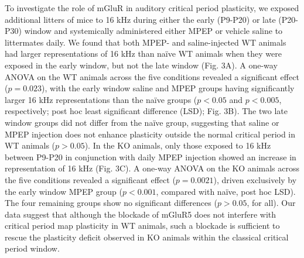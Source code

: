 To investigate the role of mGluR in auditory critical period plasticity, we exposed additional litters of mice to 16 kHz during either the early (P9-P20) or late (P20-P30) window and systemically administered either MPEP or vehicle saline to littermates daily. We found that both MPEP- and saline-injected WT animals had larger representations of 16 kHz than na\"ive WT animals when they were exposed in the early window, but not the late window (Fig. 3A). A one-way ANOVA on the WT animals across the five conditions revealed a significant effect ($p=0.023$), with the early window saline and MPEP groups having significantly larger 16 kHz representations than the na\"ive groups ($p<0.05$ and $p<0.005$, respectively; post hoc least significant difference (LSD); Fig. 3B). The two late window groups did not differ from the na\"ive group, suggesting that saline or MPEP injection does not enhance plasticity outside the normal critical period in WT animals ($p>0.05$). In the KO animals, only those exposed to 16 kHz between P9-P20 in conjunction with daily MPEP injection showed an increase in representation of 16 kHz (Fig. 3C). A one-way ANOVA on the KO animals across the five conditions revealed a significant effect ($p=0.0021$), driven exclusively by the early window MPEP group ($p<0.001$, compared with na\"ive, post hoc LSD). The four remaining groups show no significant differences ($p>0.05$, for all). Our data suggest that although the blockade of mGluR5 does not interfere with critical period map plasticity in WT animals, such a blockade is sufficient to rescue the plasticity deficit observed in KO animals within the classical critical period window.


